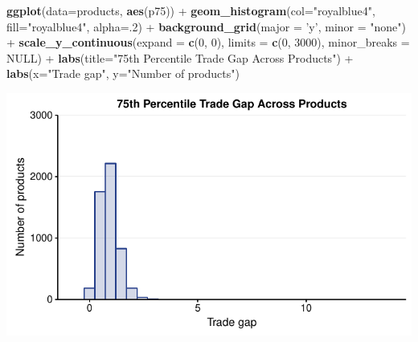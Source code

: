 \documentclass[10pt,]{article}
\newenvironment{Shaded}{\begin{snugshade}}{\end{snugshade}}
\newcommand{\KeywordTok}[1]{\textcolor[rgb]{0.13,0.29,0.53}{\textbf{{#1}}}}
\newcommand{\DataTypeTok}[1]{\textcolor[rgb]{0.13,0.29,0.53}{{#1}}}
\newcommand{\DecValTok}[1]{\textcolor[rgb]{0.00,0.00,0.81}{{#1}}}
\newcommand{\StringTok}[1]{\textcolor[rgb]{0.31,0.60,0.02}{{#1}}}
\newcommand{\OtherTok}[1]{\textcolor[rgb]{0.56,0.35,0.01}{{#1}}}
\newcommand{\NormalTok}[1]{{#1}}
\begin{document}
\begin{Shaded}
\begin{Highlighting}[]
\KeywordTok{ggplot}\NormalTok{(}\DataTypeTok{data=}\NormalTok{products, }\KeywordTok{aes}\NormalTok{(p75)) +}
\StringTok{  }\KeywordTok{geom_histogram}\NormalTok{(}\DataTypeTok{col=}\StringTok{"royalblue4"}\NormalTok{,}
                 \DataTypeTok{fill=}\StringTok{"royalblue4"}\NormalTok{,}
                 \DataTypeTok{alpha=}\NormalTok{.}\DecValTok{2}\NormalTok{) +}
\StringTok{  }\KeywordTok{background_grid}\NormalTok{(}\DataTypeTok{major =} \StringTok{'y'}\NormalTok{, }\DataTypeTok{minor =} \StringTok{"none"}\NormalTok{) +}
\StringTok{  }\KeywordTok{scale_y_continuous}\NormalTok{(}\DataTypeTok{expand =} \KeywordTok{c}\NormalTok{(}\DecValTok{0}\NormalTok{, }\DecValTok{0}\NormalTok{),  }\DataTypeTok{limits =} \KeywordTok{c}\NormalTok{(}\DecValTok{0}\NormalTok{, }\DecValTok{3000}\NormalTok{), }\DataTypeTok{minor_breaks =} \OtherTok{NULL}\NormalTok{) +}
\StringTok{  }\KeywordTok{labs}\NormalTok{(}\DataTypeTok{title=}\StringTok{"75th Percentile Trade Gap Across Products"}\NormalTok{) +}
\StringTok{  }\KeywordTok{labs}\NormalTok{(}\DataTypeTok{x=}\StringTok{"Trade gap"}\NormalTok{, }\DataTypeTok{y=}\StringTok{"Number of products"}\NormalTok{)}
\end{Highlighting}
\end{Shaded}

\begin{center}\includegraphics{Figs/value_summary-5} \end{center}
\end{document}
